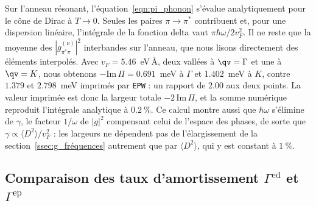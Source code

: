 
Sur l'anneau résonant, l'équation~\eqref{eqn:pi_phonon} s'évalue analytiquement pour le cône de Dirac à $T\to 0$. Seules les paires $\pi\to\pi^*$ contribuent et, pour une dispersion linéaire, l'intégrale de la fonction delta vaut $\pi\hbar\omega/2v_F^2$. Il ne reste que la moyenne des $|g^{(\nu)}_{\pi^*\pi}|^2$ interbandes sur l'anneau, que nous lisons directement des éléments interpolés. Avec $v_F=5.46$~eV\,\AA{}, deux vallées à $\qv=\Gamma$ et une à $\qv=K$, nous obtenons $-\mathrm{Im}\,\Pi=0.691$~meV à $\Gamma$ et $1.402$~meV à $K$, contre $1.379$ et $2.798$~meV imprimés par \texttt{EPW} : un rapport de $2.00$ aux deux points. La valeur imprimée est donc la largeur totale $-2\,\mathrm{Im}\,\Pi$, et la somme numérique reproduit l'intégrale analytique à $0.2~\%$. Ce calcul montre aussi que $\hbar\omega$ s'élimine de $\gamma$, le facteur $1/\omega$ de $|g|^2$ compensant celui de l'espace des phases, de sorte que $\gamma\propto\langle D^2\rangle/v_F^2$ : les largeurs ne dépendent pas de l'élargissement de la section~\ref{ssec:g_fréquences} autrement que par $\langle D^2\rangle$, qui y est constant à $1~\%$.

\subsection{Comparaison des taux d'amortissement $\Gamma^\text{ed}$ et $\Gamma^\text{ep}$}\label{sec:g_comparaison}

